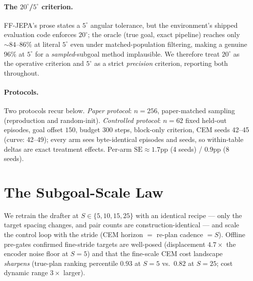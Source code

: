 \documentclass[11pt]{article}
\newcommand{\degc}[1]{$#1^\circ$}
\begin{document}
\paragraph{The \degc{20}/\degc{5} criterion.} FF-JEPA's prose states a \degc{5} angular
tolerance, but the environment's shipped evaluation code enforces \degc{20}; the oracle
(true goal, exact pipeline) reaches only ${\sim}84$--$86\%$ at literal \degc{5} even
under matched-population filtering, making a genuine $96\%$ at \degc{5} for a
\emph{sampled}-subgoal method implausible. We therefore treat \degc{20} as the operative
criterion and \degc{5} as a strict \emph{precision} criterion, reporting both throughout.

\paragraph{Protocols.} Two protocols recur below. \emph{Paper protocol}: $n{=}256$,
paper-matched sampling (reproduction and random-init). \emph{Controlled protocol}:
$n{=}62$ fixed held-out episodes, goal offset $150$, budget $300$ steps, block-only
criterion, CEM seeds 42--45 (curve: 42--49); every arm sees byte-identical episodes and
seeds, so within-table deltas are exact treatment effects. Per-arm
$\mathrm{SE}\approx1.7$pp (4 seeds) / $0.9$pp (8 seeds).

\section{The Subgoal-Scale Law}
\label{sec:scale}

We retrain the drafter at $S\in\{5,10,15,25\}$ with an identical recipe --- only the
target spacing changes, and pair counts are construction-identical --- and scale the
control loop with the stride (CEM horizon $=$ re-plan cadence $=S$). Offline pre-gates
confirmed fine-stride targets are well-posed (displacement $4.7\times$ the encoder noise
floor at $S{=}5$) and that the fine-scale CEM cost landscape \emph{sharpens} (true-plan
ranking percentile $0.93$ at $S{=}5$ vs.\ $0.82$ at $S{=}25$; cost dynamic range
$3\times$ larger).
\end{document}
